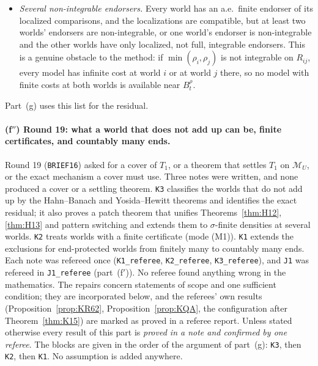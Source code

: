 \documentclass[11pt]{article}
\theoremstyle{definition}
\theoremstyle{remark}
\newcommand{\M}{\mathcal M}
\newcommand{\src}[1]{\texttt{#1}}
\begin{document}
\begin{itemize}[leftmargin=*]
\item[\textbf{(D)}] \emph{Several non-integrable endorsers.} Every world has an a.e.\ finite endorser of its localized comparisons, and the localizations are compatible, but at least two worlds' endorsers are non-integrable, or one world's endorser is non-integrable and the other worlds have only localized, not full, integrable endorsers. This is a genuine obstacle to the method: if $\min(\rho_i,\rho_j)$ is not integrable on $R_{ij}$, every model has infinite cost at world $i$ or at world $j$ there, so no model with finite costs at both worlds is available near $B^\rho_t$.
\end{itemize}
Part~(g) uses this list for the residual.

\paragraph{(f$''$) Round 19: what a world that does not add up can be, finite certificates, and countably many ends.} Round 19 (\src{BRIEF16}) asked for a cover of $T_1$, or a theorem that settles $T_1$ on $\M_U$, or the exact mechanism a cover must use. Three notes were written, and none produced a cover or a settling theorem. \src{K3} classifies the worlds that do not add up by the Hahn--Banach and Yosida--Hewitt theorems and identifies the exact residual; it also proves a patch theorem that unifies Theorems~\ref{thm:H12}, \ref{thm:H13} and pattern switching and extends them to $\sigma$-finite densities at several worlds. \src{K2} treats worlds with a finite certificate (mode (M1)). \src{K1} extends the exclusions for end-protected worlds from finitely many to countably many ends. Each note was refereed once (\src{K1\_referee}, \src{K2\_referee}, \src{K3\_referee}), and \src{J1} was refereed in \src{J1\_referee} (part~(f$'$)). No referee found anything wrong in the mathematics. The repairs concern statements of scope and one sufficient condition; they are incorporated below, and the referees' own results (Proposition~\ref{prop:KR62}, Proposition~\ref{prop:KQA}, the configuration after Theorem~\ref{thm:K15}) are marked as proved in a referee report. Unless stated otherwise every result of this part is \emph{proved in a note and confirmed by one referee}. The blocks are given in the order of the argument of part~(g): \src{K3}, then \src{K2}, then \src{K1}. No assumption is added anywhere.
\end{document}
